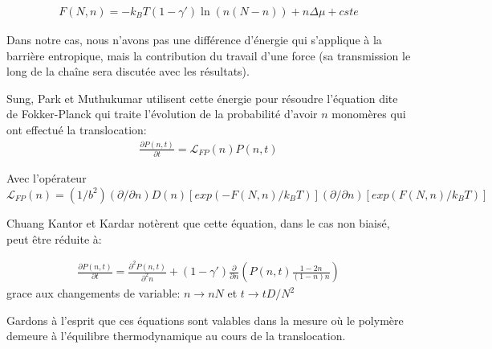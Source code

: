 \documentclass[a4paper,11pt]{article}
\begin{document}
\begin{eqnarray}
F(N,n)= -k_BT(1-\gamma')\ln \left(n(N-n)\right) + n \Delta \mu +cste
\label{energbargen}
\end{eqnarray}

Dans notre cas, nous n'avons pas une différence d'énergie qui s'applique à la barrière entropique, mais la contribution du travail d'une force (sa transmission le long de la chaîne sera discutée avec les résultats).

Sung, Park et Muthukumar \cite{Sung1996,Muthukumar1999} utilisent cette énergie pour résoudre l'équation dite de Fokker-Planck qui traite l'évolution de la probabilité d'avoir $n$ monomères qui ont effectué la translocation:
\begin{eqnarray}
\frac{\partial P(n,t)}{\partial t} =   \mathcal{L}_{FP}(n) P(n,t)
\label{equfokkerplank1}
\end{eqnarray}

Avec l'opérateur $\mathcal{L}_{FP}(n)= (1/b^2)(\partial/\partial n) D(n)[exp(-F(N,n)/k_BT)](\partial/\partial n)[exp(F(N,n)/k_BT)]$

Chuang Kantor et Kardar \cite{Chuang2001} notèrent que cette équation, dans le cas non biaisé, peut être réduite à:

\begin{eqnarray}
\frac{\partial P(n,t)}{\partial t} =   \frac{\partial ^2 P(n,t)}{\partial ^2 n} +(1-\gamma') \frac{\partial  }{\partial  n}\left(P(n,t)\frac{1-2n}{(1-n)n}\right)
\label{equfokkerplank2}
\end{eqnarray}
grace aux changements de variable:
$n \rightarrow nN$ et $t \rightarrow tD/N^2$


Gardons à l'esprit que ces équations sont valables dans la mesure où le polymère demeure à l'équilibre thermodynamique au cours de la translocation.
\end{document}
